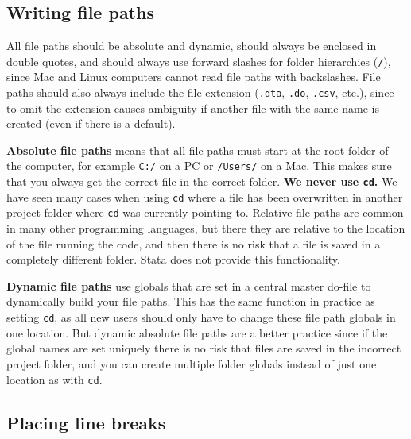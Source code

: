 
\subsection{Writing file paths}

All file paths should be absolute and dynamic, should always be enclosed in double quotes, and should
always use forward slashes for folder hierarchies (\texttt{/}), since Mac and Linux computers cannot read file paths with backslashes.
File paths should also always include the file extension (\texttt{.dta}, \texttt{.do}, \texttt{.csv}, etc.),
since to omit the extension causes ambiguity if another file with the same name is created (even if there is a default).

\textbf{Absolute file paths} means that all file paths must start at the root folder of the computer, for
example \texttt{C:/} on a PC or \texttt{/Users/} on a Mac. This makes sure that
you always get the correct file in the correct folder. \textbf{We never use \texttt{cd}.}
We have seen many cases when using \texttt{cd} where
a file has been overwritten in another project folder where \texttt{cd} was currently pointing to.
Relative file paths are common in many other programming languages, but there they are relative to the
location of the file running the code, and then there is no risk that a file is saved in a completely different folder.
Stata does not provide this functionality.

\textbf{Dynamic file paths} use globals that are set in a central master do-file to dynamically build your file
paths. This has the same function in practice as setting \texttt{cd}, as all new users should only have to change these
file path globals in one location. But dynamic absolute file paths are a better practice since if the
global names are set uniquely there is no risk that files are saved in the incorrect project folder, and
you can create multiple folder globals instead of just one location as with \texttt{cd}.


\subsection{Placing line breaks}

